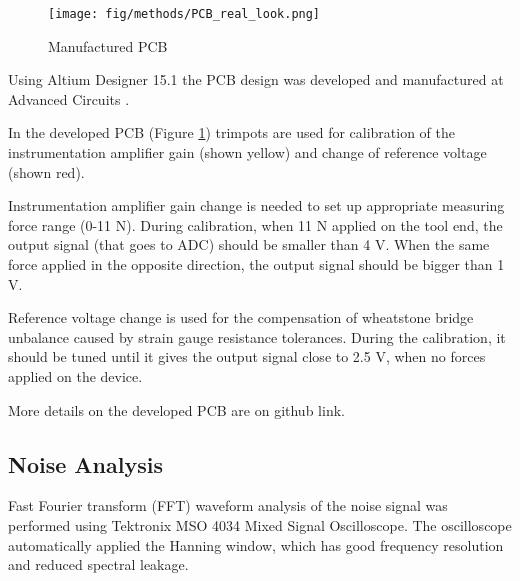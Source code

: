 \begin{figure}[h]
	\begin{center}
		\texttt{[image: fig/methods/PCB\_real\_look.png]}
	\end{center}
	\vspace{-4mm}
	\caption[Manufactured PCB]
	{Manufactured PCB}
	\label{fig:PCB_real}
	\vspace{-2mm}
\end{figure}
	
Using Altium Designer 15.1 the PCB design was developed and manufactured at Advanced Circuits \cite{PCB_manufacturer}. 

In the developed PCB (Figure \ref{fig:PCB_real}) trimpots are used for calibration of the instrumentation amplifier gain (shown yellow) and change of reference voltage (shown red).

Instrumentation amplifier gain change is needed to set up appropriate measuring force range (0-11 N). During calibration, when 11 N applied on the tool end, the output signal (that goes to ADC) should be smaller than 4 V. When the same force applied in the opposite direction, the output signal should be bigger than 1 V.
 
Reference voltage change is used for the compensation of wheatstone bridge unbalance caused by strain gauge resistance tolerances. During the calibration, it should be tuned until it gives the output signal close to 2.5 V, when no forces applied on the device.

More details on the developed PCB are on github link.

	\subsection{Noise Analysis}
	\label{sec:NoiseExp}
	Fast Fourier transform (FFT) waveform analysis of the noise signal was performed using Tektronix MSO 4034 Mixed Signal Oscilloscope. The oscilloscope automatically applied the Hanning window, which has good frequency resolution and reduced spectral leakage\cite{harris_use_1978}.
	
